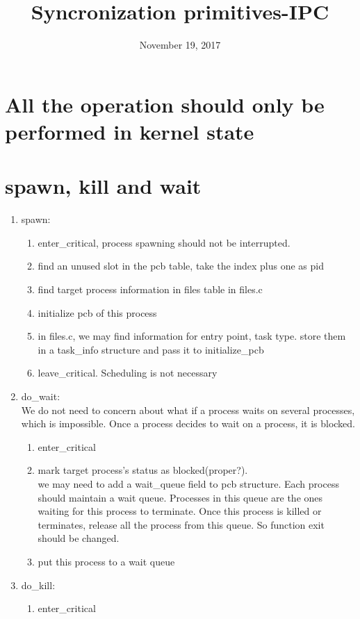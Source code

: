 \documentclass{article}
\title{Syncronization primitives-IPC}
\date{November 19, 2017}
\begin{document}
\maketitle
\section*{All the operation should only be performed in kernel state}
\section{spawn, kill and wait}
\begin{enumerate}
\item spawn:
  \begin{enumerate}
  \item enter\_critical, process spawning should not be interrupted.
  \item find an unused slot in the pcb table, take the index plus one as pid
  \item find target process information in files table in files.c
  \item initialize pcb of this process
  \item in files.c, we may find information for entry point, task type. store them in a task\_info structure and pass it to initialize\_pcb
  \item leave\_critical. Scheduling is not necessary
  \end{enumerate}
\item do\_wait:\\
  We do not need to concern about what if a process waits on several processes, which is impossible. Once a process decides to wait on a process, it is blocked.
  \begin{enumerate}
  \item enter\_critical
  \item  mark target process's status as blocked(proper?).\\
    we may need to add a wait\_queue field to pcb structure. Each process should maintain a wait queue. Processes in this queue are the ones waiting for this process to terminate. Once this process is killed or terminates, release all the process from this queue. So function exit should be changed.
  \item put this process to a wait queue
  \end{enumerate}
  \item do\_kill:
  \begin{enumerate}
  \item enter\_critical

\end{enumerate}
\end{enumerate}
\end{document}
